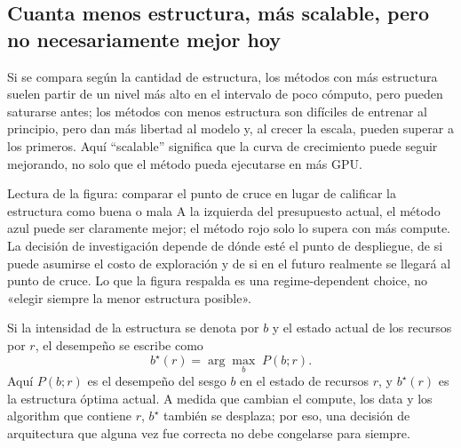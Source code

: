 
\subsection{Cuanta menos estructura, más scalable, pero no necesariamente mejor hoy}

Si se compara según la cantidad de estructura, los métodos con más estructura suelen partir de un nivel más alto en el intervalo de poco cómputo, pero pueden saturarse antes; los métodos con menos estructura son difíciles de entrenar al principio, pero dan más libertad al modelo y, al crecer la escala, pueden superar a los primeros. Aquí ``scalable'' significa que la curva de crecimiento puede seguir mejorando, no solo que el método pueda ejecutarse en más GPU.


\begin{knowledgebox}{Lectura de la figura: comparar el punto de cruce en lugar de calificar la estructura como buena o mala}
A la izquierda del presupuesto actual, el método azul puede ser claramente mejor; el método rojo solo lo supera con más compute. La decisión de investigación depende de dónde esté el punto de despliegue, de si puede asumirse el costo de exploración y de si en el futuro realmente se llegará al punto de cruce. Lo que la figura respalda es una regime-dependent choice, no «elegir siempre la menor estructura posible».
\end{knowledgebox}



Si la intensidad de la estructura se denota por $b$ y el estado actual de los recursos por $r$, el desempeño se escribe como
\[
b^{\star}(r)=\arg\max_b\; P(b;r).
\]
Aquí $P(b;r)$ es el desempeño del sesgo $b$ en el estado de recursos $r$, y $b^{\star}(r)$ es la estructura óptima actual. A medida que cambian el compute, los data y los algorithm que contiene $r$, $b^{\star}$ también se desplaza; por eso, una decisión de arquitectura que alguna vez fue correcta no debe congelarse para siempre.

